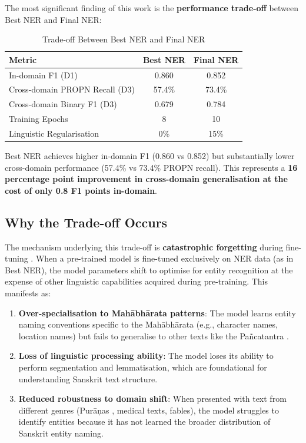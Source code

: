 The most significant finding of this work is the \textbf{performance trade-off} between Best NER and Final NER:

\begin{table}[htbp]
    \centering
    \caption{Trade-off Between Best NER and Final NER}
    \label{tab:tradeoff}
    \begin{tabular}{lcc}
        \toprule
        \textbf{Metric} & \textbf{Best NER} & \textbf{Final NER} \\
        \midrule
        In-domain F1 (D1) & 0.860 & 0.852 \\
        Cross-domain PROPN Recall (D3) & 57.4\% & 73.4\% \\
        Cross-domain Binary F1 (D3) & 0.679 & 0.784 \\
        Training Epochs & 8 & 10 \\
        Linguistic Regularisation & 0\% & 15\% \\
        \bottomrule
    \end{tabular}
\end{table}

Best NER achieves higher in-domain F1 (0.860 vs 0.852) but substantially lower cross-domain performance (57.4\% vs 73.4\% PROPN recall). This represents a \textbf{16 percentage point improvement in cross-domain generalisation at the cost of only 0.8 F1 points in-domain}.

\subsection{Why the Trade-off Occurs}

The mechanism underlying this trade-off is \textbf{catastrophic forgetting} during fine-tuning \cite{mccloskey1989catastrophic, goodfellow2013empirical}. When a pre-trained model is fine-tuned exclusively on NER data (as in Best NER), the model parameters shift to optimise for entity recognition at the expense of other linguistic capabilities acquired during pre-training. This manifests as:

\begin{enumerate}
    \item \textbf{Over-specialisation to Mahābhārata \cite{mahabharata} patterns}: The model learns entity naming conventions specific to the Mahābhārata (e.g., character names, location names) but fails to generalise to other texts like the Pañcatantra \cite{pancatantra_text}.
    \item \textbf{Loss of linguistic processing ability}: The model loses its ability to perform segmentation and lemmatisation, which are foundational for understanding Sanskrit text structure.
    \item \textbf{Reduced robustness to domain shift}: When presented with text from different genres (Purāṇas \cite{purana}, medical texts, fables), the model struggles to identify entities because it has not learned the broader distribution of Sanskrit entity naming.
\end{enumerate}

